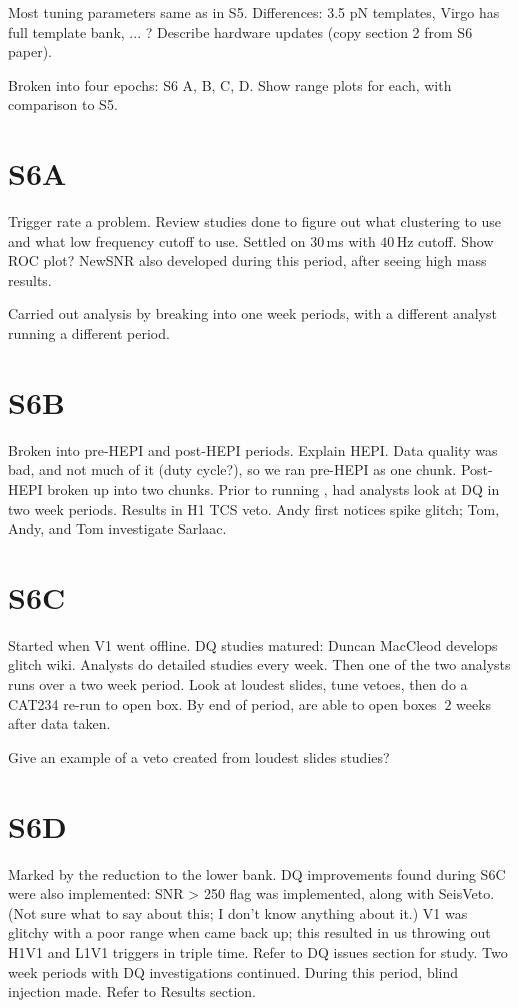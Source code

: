 Most tuning parameters same as in S5. Differences: 3.5 \ac{pN} templates, Virgo has full template bank, ... ? Describe hardware updates (copy section 2 from S6 paper).

Broken into four epochs: S6 A, B, C, D. Show range plots for each, with comparison to S5.

\section{S6A}

Trigger rate a problem. Review studies done to figure out what clustering to use and what low frequency cutoff to use. Settled on $30\,$ms with $40\,$Hz cutoff. Show ROC plot? NewSNR also developed during this period, after seeing high mass results.

Carried out \ihope analysis by breaking into one week periods, with a different analyst running a different period.

\section{S6B}

Broken into pre-HEPI and post-HEPI periods. Explain HEPI. Data quality was bad, and not much of it (duty cycle?), so we ran pre-HEPI as one chunk. Post-HEPI broken up into two chunks. Prior to running \ihope, had analysts look at DQ in two week periods. Results in H1 TCS veto. Andy first notices spike glitch; Tom, Andy, and Tom investigate Sarlaac.

\section{S6C}

Started when V1 went offline. DQ studies matured: Duncan MacCleod develops glitch wiki. Analysts do detailed studies every week. Then one of the two analysts runs \ihope over a two week period. Look at loudest slides, tune vetoes, then do a CAT234 re-run to open box. By end of period, are able to open boxes $~2$ weeks after data taken.

Give an example of a veto created from loudest slides studies?

\section{S6D}

Marked by the reduction to the lower bank. DQ improvements found during S6C were also implemented: SNR > 250 flag was implemented, along with SeisVeto. (Not sure what to say about this; I don't know anything about it.) V1 was glitchy with a poor range when came back up; this resulted in us throwing out H1V1 and L1V1 triggers in triple time. Refer to DQ issues section for study. Two week \ihope periods with DQ investigations continued. During this period, blind injection made. Refer to Results section. 

